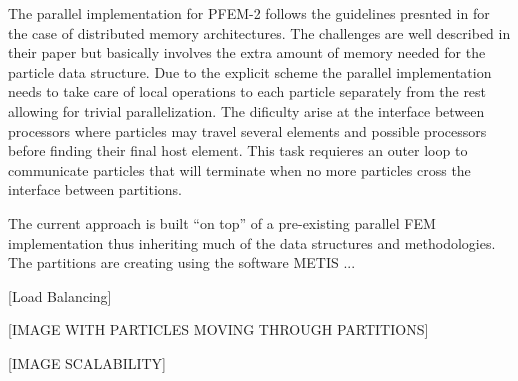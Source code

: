 The parallel implementation for PFEM-2 follows the guidelines presnted in \cite{gimenez:parallel} for the case of distributed memory architectures. The challenges are well described in their paper but basically involves the extra amount of memory needed for the particle data structure. Due to the explicit scheme the parallel implementation needs to take care of local operations to each particle separately from the rest allowing for trivial parallelization. The dificulty arise at the interface between processors where particles may travel several elements and possible processors before finding their final host element. This task requieres an outer loop to communicate particles that will terminate when no more particles cross the interface between partitions.

The current approach is built ``on top'' of a pre-existing parallel FEM implementation thus inheriting much of the data structures and methodologies. The partitions are creating using the software METIS \cite{metis}...

[Load Balancing]



[IMAGE WITH PARTICLES MOVING THROUGH PARTITIONS]



[IMAGE SCALABILITY]


 
